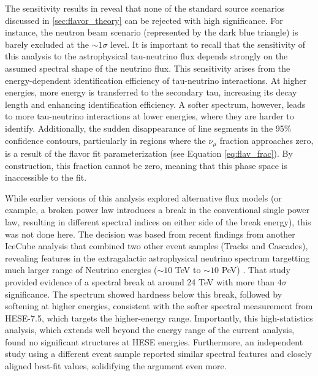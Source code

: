 The sensitivity results in  reveal that none of the standard source scenarios discussed in \ref{sec:flavor_theory} can be rejected with high significance. For instance, the neutron beam scenario (represented by the dark blue triangle) is barely excluded at the $\sim1\sigma$ level. It is important to recall that the sensitivity of this analysis to the astrophysical tau-neutrino flux depends strongly on the assumed spectral shape of the neutrino flux. This sensitivity arises from the energy-dependent identification efficiency of tau-neutrino interactions. At higher energies, more energy is transferred to the secondary tau, increasing its decay length and enhancing identification efficiency. A softer spectrum, however, leads to more tau-neutrino interactions at lower energies, where they are harder to identify. Additionally, the sudden disappearance of line segments in the 95\% confidence contours, particularly in regions where the $\nu_\mu$ fraction approaches zero, is a result of the flavor fit parameterization (see Equation \ref{eq:flav_frac}). By construction, this fraction cannot be zero, meaning that this phase space is inaccessible to the fit.

While earlier versions of this analysis explored alternative flux models (or example, a broken power law introduces a break in the conventional single power law, resulting in different spectral indices on either side of the break energy), this was not done here. The decision was based from recent findings from another IceCube analysis that combined two other event samples (Tracks and Cascades), revealing features in the extragalactic astrophysical neutrino spectrum targetting much larger range of Neutrino energies ($\sim10$ TeV to $\sim10$ PeV) . That study provided evidence of a spectral break at around 24 TeV with more than $4\sigma$ significance. The spectrum showed hardness below this break, followed by softening at higher energies, consistent with the softer spectral measurement from HESE-7.5, which targets the higher-energy range. Importantly, this high-statistics analysis, which extends well beyond the energy range of the current analysis, found no significant structures at HESE energies. Furthermore, an independent study using a different event sample  reported similar spectral features and closely aligned best-fit values, solidifying the argument even more. 

